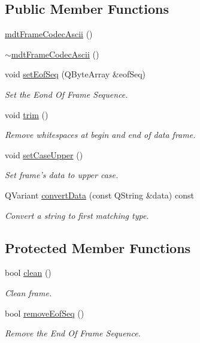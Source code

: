 \subsection*{Public Member Functions}
\begin{DoxyCompactItemize}
\item 
\hyperlink{classmdt_frame_codec_ascii_af411727ef3d8a935a863f28c99eaa695}{mdt\-Frame\-Codec\-Ascii} ()
\item 
\hyperlink{classmdt_frame_codec_ascii_a5c0c37daf7f203a59ec9d0f3af361100}{$\sim$mdt\-Frame\-Codec\-Ascii} ()
\item 
void \hyperlink{classmdt_frame_codec_ascii_a771d983498fb298595afbb97ee7a40f1}{set\-Eof\-Seq} (Q\-Byte\-Array \&eof\-Seq)
\begin{DoxyCompactList}\small\item\em Set the Eond Of Frame Sequence. \end{DoxyCompactList}\item 
void \hyperlink{classmdt_frame_codec_ascii_a0e8b9664e1451400e1b955c5180c0de8}{trim} ()
\begin{DoxyCompactList}\small\item\em Remove whitespaces at begin and end of data frame. \end{DoxyCompactList}\item 
void \hyperlink{classmdt_frame_codec_ascii_a119506d484a807d3486d47738ee22920}{set\-Case\-Upper} ()
\begin{DoxyCompactList}\small\item\em Set frame's data to upper case. \end{DoxyCompactList}\item 
Q\-Variant \hyperlink{classmdt_frame_codec_ascii_aca3ccdf0bc617747e99ed1672344b880}{convert\-Data} (const Q\-String \&data) const 
\begin{DoxyCompactList}\small\item\em Convert a string to first matching type. \end{DoxyCompactList}\end{DoxyCompactItemize}
\subsection*{Protected Member Functions}
\begin{DoxyCompactItemize}
\item 
bool \hyperlink{classmdt_frame_codec_ascii_a1dc1b7eda5e034c41b27c431227881e1}{clean} ()
\begin{DoxyCompactList}\small\item\em Clean frame. \end{DoxyCompactList}\item 
bool \hyperlink{classmdt_frame_codec_ascii_ab9aebbbadb6d40b1353634154e6a28c0}{remove\-Eof\-Seq} ()
\begin{DoxyCompactList}\small\item\em Remove the End Of Frame Sequence. \end{DoxyCompactList}\end{DoxyCompactItemize}
